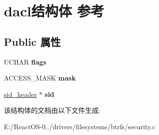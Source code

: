 \hypertarget{structdacl}{}\section{dacl结构体 参考}
\label{structdacl}
\subsection*{Public 属性}
\begin{DoxyCompactItemize}
\item 
\mbox{\label{structdacl_a9b299f006936ee2f5089d60318d78aad}} 
U\+C\+H\+AR {\bfseries flags}
\item 
\mbox{\label{structdacl_ad5e2dbebfed8394298aba7e09125c7a4}} 
A\+C\+C\+E\+S\+S\+\_\+\+M\+A\+SK {\bfseries mask}
\item 
\mbox{\label{structdacl_aa8ec257f99066ee05fe1d5e39363cff9}} 
\hyperlink{structsid__header}{sid\+\_\+header} $\ast$ {\bfseries sid}
\end{DoxyCompactItemize}


该结构体的文档由以下文件生成\+:\begin{DoxyCompactItemize}
\item 
E\+:/\+React\+O\+S-\/0../drivers/filesystems/btrfs/security.\+c\end{DoxyCompactItemize}
